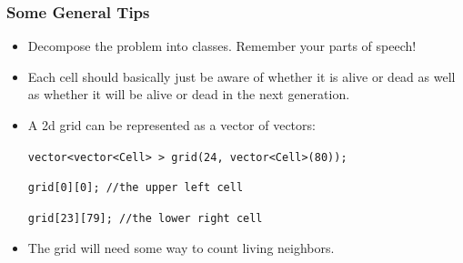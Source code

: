 \documentclass[handout]{beamer}
\begin{document}
\begin{frame}
    \frametitle{Some General Tips}
    \begin{itemize}
        \item Decompose the problem into classes.  Remember your parts of 
            speech!
        \item Each cell should basically just be aware of whether it is 
            alive or dead as well as whether it will be alive or dead in
            the next generation.
        \item A 2d grid can be represented as a vector of vectors:
            \par{\tt vector<vector<Cell> > grid(24, vector<Cell>(80));}
            \par{\tt grid[0][0];   //the upper left cell}
            \par{\tt grid[23][79]; //the lower right cell}
        \item The grid will need some way to count living neighbors.
    \end{itemize}
\end{frame}
\end{document}
